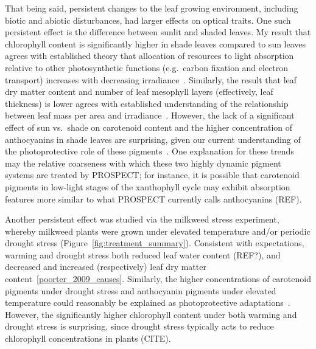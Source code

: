 That being said, persistent changes to the leaf growing environment, including biotic and abiotic disturbances, had larger effects on optical traits.
One such persistent effect is the difference between sunlit and shaded leaves.
My result that chlorophyll content is significantly higher in shade leaves compared to sun leaves agrees with established theory that allocation of resources to light absorption relative to other photosynthetic functions (e.g.\ carbon fixation and electron transport) increases with decreasing irradiance~\cite{hikosaka_1995_model}.
Similarly, the result that leaf dry matter content and number of leaf mesophyll layers (effectively, leaf thickness) is lower agrees with established understanding of the relationship between leaf mass per area and irradiance~\cite{poorter_2009_causes}.
However, the lack of a significant effect of sun vs.\ shade on carotenoid content and the higher concentration of anthocyanins in shade leaves are surprising, given our current understanding of the photoprotective role of these pigments~\cite{young_1991_photoprotective,steyn_2002_anthocyanins}.
One explanation for these trends may the relative coarseness with which these two highly dynamic pigment systems are treated by PROSPECT\@;
for instance, it is possible that carotenoid pigments in low-light stages of the xanthophyll cycle may exhibit absorption features more similar to what PROSPECT currently calls anthocyanins (REF). %

Another persistent effect was studied via the milkweed stress experiment, whereby milkweed plants were grown under elevated temperature and/or periodic drought stress (Figure~\ref{fig:treatment_summary}).
Consistent with expectations, warming and drought stress both reduced leaf water content (REF?), and decreased and increased (respectively) leaf dry matter content~\ref{poorter_2009_causes}.
Similarly, the higher concentrations of carotenoid pigments under drought stress and anthocyanin pigments under elevated temperature could reasonably be explained as photoprotective adaptations~\cite{young_1991_photoprotective,steyn_2002_anthocyanins}.
However, the significantly higher chlorophyll content under both warming and drought stress is surprising, since drought stress typically acts to reduce chlorophyll concentrations in plants (CITE).

